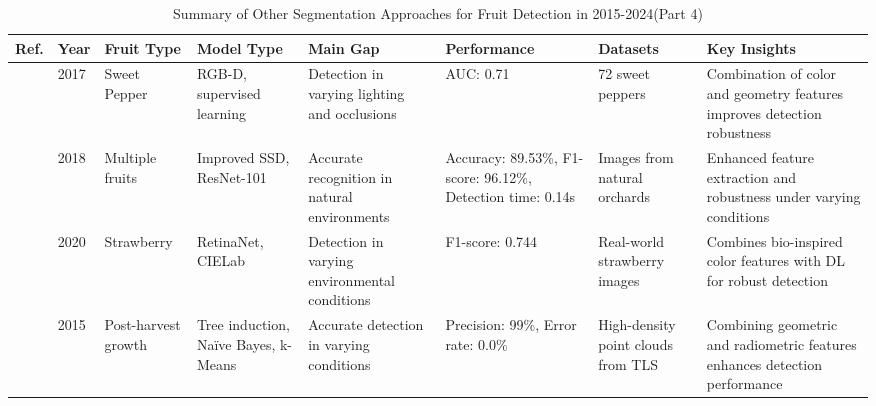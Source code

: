 \documentclass[a4paper,fleqn]{cas-dc}
\begin{document}
\begin{table}[htbp]
	\centering
	\footnotesize 
	\addtocounter{table}{-1}
	\caption{Summary of Other Segmentation Approaches for Fruit Detection in 2015-2024(Part 4)} 
	\label{tab:machinelearning-based} 
	\begin{tabular}{@{}p{0.4cm}p{0.4cm}p{1.4cm}p{1.4cm}p{2cm}p{2cm}p{2cm}p{4.5cm}@{}}
	\toprule
	\textbf{Ref.} & \textbf{Year} & \textbf{Fruit Type} & \textbf{Model Type} & \textbf{Main Gap} & \textbf{Performance} & \textbf{Datasets} & \textbf{Key Insights} \\ \midrule
\cite{sa2017peduncle}& 2017 & Sweet Pepper & RGB-D, supervised learning & Detection in varying lighting and occlusions & AUC: 0.71 & 72 sweet peppers & Combination of color and geometry features improves detection robustness \\ \midrule
\cite{peng2018general} & 2018 & Multiple fruits & Improved SSD, ResNet-101 & Accurate recognition in natural environments & Accuracy: 89.53\%, F1-score: 96.12\%, Detection time: 0.14s & Images from natural orchards & Enhanced feature extraction and robustness under varying conditions \\ \midrule
\cite{kirk2020b} & 2020 & Strawberry & RetinaNet, CIELab & Detection in varying environmental conditions & F1-score: 0.744 & Real-world strawberry images & Combines bio-inspired color features with DL for robust detection \\ \midrule
\cite{koenig2015comparative}& 2015 & Post-harvest growth & Tree induction, Naïve Bayes, k-Means & Accurate detection in varying conditions & Precision: 99\%, Error rate: 0.0\% & High-density point clouds from TLS & Combining geometric and radiometric features enhances detection performance \\ \midrule


\end{tabular}
\end{table}
\end{document}
